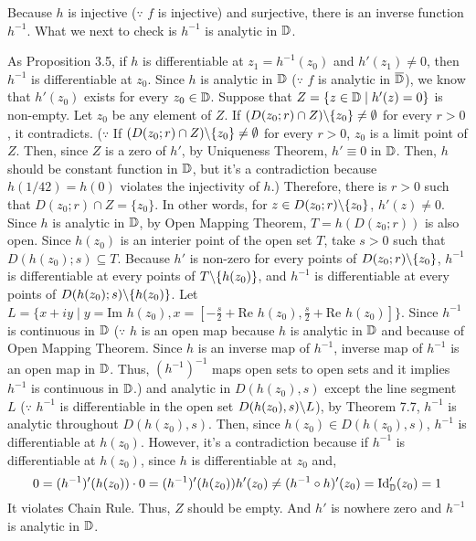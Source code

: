 Because \(h\) is injective (\(\because\) \(f\) is injective) and surjective,
there is an inverse function \(h^{-1}\).
What we next to check is \(h^{-1}\) is analytic in \(\mathbb{D}\).

As Proposition 3.5, if \(h\) is differentiable at \(z_1 = h^{-1}(z_0)\)
and \(h'(z_1) \neq 0\), then \(h^{-1}\) is differentiable at \(z_0\).
Since \(h\) is analytic in \(\mathbb{D}\) (\(\because\) \(f\) is analytic in \(\overline{\mathbb{D}}\)), we know that \(h'(z_0)\) exists for every \(z_0 \in \mathbb{D}\).
Suppose that \(Z = \{z \in \mathbb{D} \mid h'(z) = 0\}\) is non-empty.
Let \(z_0\) be any element of \(Z\).
If \((D(z_0; r) \cap Z) \bs \{z_0\} \neq \emptyset\) for every \(r > 0\), it contradicts.
(\(\because\) If \((D(z_0; r) \cap Z) \bs \{z_0\} \neq \emptyset\) for every \(r > 0\),
 \(z_0\) is a limit point of \(Z\).
 Then, since \(Z\) is a zero of \(h'\), by Uniqueness Theorem, \(h' \equiv 0\) in \(\mathbb{D}\).
 Then, \(h\) should be constant function in \(\mathbb{D}\),
 but it's a contradiction because \(h(1/42) = h(0)\) violates the injectivity of \(h\).)
Therefore, there is \(r > 0\) such that \(D(z_0; r) \cap Z = \{z_0\}\).
In other words, for \(z \in D(z_0; r) \bs \{z_0\}\), \(h'(z) \neq 0\).
Since \(h\) is analytic in \(\mathbb{D}\), by Open Mapping Theorem,
\(T = h(D(z_0; r))\) is also open.
Since \(h(z_0)\) is an interier point of the open set \(T\),
take \(s > 0\) such that \(D(h(z_0); s) \subseteq T\).
Because \(h'\) is non-zero for every points of \(D(z_0; r) \bs \{z_0\}\),
\(h^{-1}\) is differentiable at every points of \(T \bs \{h(z_0)\}\),
and \(h^{-1}\) is differentiable at every points of \(D(h(z_0); s) \bs \{h(z_0)\}\).
Let \(L = \{x + iy \mid y = \text{Im } h(z_0), x = [-\frac{s}{2} + \text{Re } h(z_0), \frac{s}{2} + \text{Re } h(z_0)]\}\).
Since \(h^{-1}\) is continuous in \(\mathbb{D}\)
(\(\because\) \(h\) is an open map because \(h\) is analytic in \(\mathbb{D}\) and because of Open Mapping Theorem. Since \(h\) is an inverse map of \(h^{-1}\), inverse map of \(h^{-1}\) is an open map in \(\mathbb{D}\). Thus, \((h^{-1})^{-1}\) maps open sets to open sets and it implies \(h^{-1}\) is continuous in \(\mathbb{D}\).)
and analytic in \(D(h(z_0), s)\) except the line segment \(L\)
(\(\because\) \(h^{-1}\) is differentiable in the open set \(D(h(z_0), s) \bs L\)),
by Theorem 7.7, \(h^{-1}\) is analytic throughout \(D(h(z_0), s)\).
Then, since \(h(z_0) \in D(h(z_0), s)\), \(h^{-1}\) is differentiable at \(h(z_0)\).
However, it's a contradiction because if \(h^{-1}\) is differentiable at \(h(z_0)\), since \(h\) is differentiable at \(z_0\) and,
\[0 = (h^{-1})'(h(z_0)) \cdot 0 = (h^{-1})'(h(z_0))h'(z_0) \neq
  (h^{-1} \circ h)'(z_0) = \text{Id}_{\mathbb{D}}'(z_0) = 1\]
It violates Chain Rule.
Thus, \(Z\) should be empty.
And \(h'\) is nowhere zero and \(h^{-1}\) is analytic in \(\mathbb{D}\).
\newline

